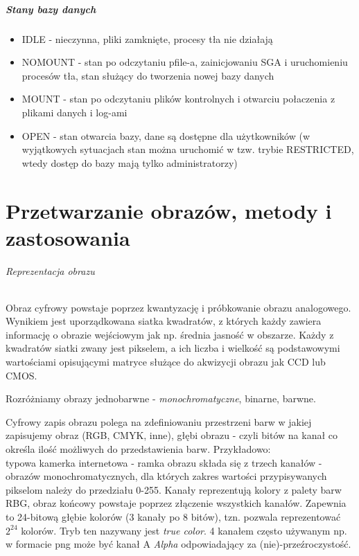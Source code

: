 \documentclass[]{report}
\begin{document}
\paragraph{Stany bazy danych}

\begin{itemize}
\item IDLE - nieczynna, pliki zamknięte, procesy tła nie działają 
\item NOMOUNT - stan po odczytaniu pfile-a, zainicjowaniu SGA i uruchomieniu procesów tła, stan służący do tworzenia nowej bazy danych

\item MOUNT - stan po odczytaniu plików kontrolnych i otwarciu połaczenia z plikami danych i log-ami

\item OPEN - stan otwarcia bazy, dane są dostępne dla użytkowników (w wyjątkowych sytuacjach stan można uruchomić w tzw. trybie RESTRICTED, wtedy dostęp do bazy mają tylko administratorzy)

\end{itemize}

\chapter{Przetwarzanie obrazów, metody i zastosowania}
\subparagraph{Reprezentacja obrazu}
Obraz cyfrowy powstaje poprzez kwantyzację i próbkowanie obrazu analogowego. Wynikiem jest uporządkowana siatka kwadratów, z których każdy zawiera informację o obrazie wejściowym jak np. średnia jasność w obszarze. Każdy z kwadratów siatki zwany jest pikselem, a ich liczba i wielkość są podstawowymi wartościami opisującymi matryce służące do akwizycji obrazu jak CCD lub CMOS.

Rozróżniamy obrazy jednobarwne - \textit{monochromatyczne}, binarne, barwne.

Cyfrowy zapis obrazu polega na zdefiniowaniu przestrzeni barw w jakiej zapisujemy obraz (RGB, CMYK, inne), głębi obrazu - czyli bitów na kanał co określa ilość możliwych do przedstawienia barw. Przykładowo: \\
typowa kamerka internetowa - ramka obrazu składa się z trzech kanałów - obrazów monochromatycznych, dla których zakres wartości przypisywanych pikselom należy do przedziału 0-255. Kanały reprezentują kolory z palety barw RBG, obraz końcowy powstaje poprzez złączenie wszystkich kanałów. 
Zapewnia to 24-bitową głębie kolorów (3 kanały po 8 bitów), tzn. pozwala reprezentować $2^{24}$  kolorów. Tryb ten nazywany jest \textit{true color}. 
4 kanałem często używanym np. w formacie png może być kanał A \textit{Alpha} odpowiadający za (nie)-przeźroczystość.
\end{document}
